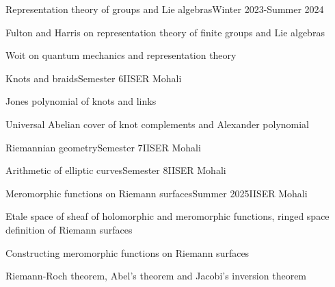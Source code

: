 \documentclass{LoLaTeXcv}
\begin{document}

\begin{lltxJob}{Representation theory of groups and Lie algebras}{Winter 2023-Summer 2024}{}
	\item Fulton and Harris on representation theory of finite groups and Lie algebras
	\item Woit on quantum mechanics and representation theory
\end{lltxJob}


\begin{lltxJob}{Knots and braids}{Semester 6}{IISER Mohali}
	\item Jones polynomial of knots and links
	\item Universal Abelian cover of knot complements and Alexander polynomial
\end{lltxJob}

\begin{lltsJob}{Riemannian geometry}{Semester 7}{IISER Mohali}
\end{lltsJob}

\begin{lltsJob}{Arithmetic of elliptic curves}{Semester 8}{IISER Mohali}
\end{lltsJob}

\begin{lltxJob}{Meromorphic functions on Riemann surfaces}{Summer 2025}{IISER Mohali}
	\item Etale space of sheaf of holomorphic and meromorphic functions, ringed space definition of Riemann surfaces
	\item Constructing meromorphic functions on Riemann surfaces
	\item Riemann-Roch theorem, Abel's theorem and Jacobi's inversion theorem
\end{lltxJob}
\end{document}
